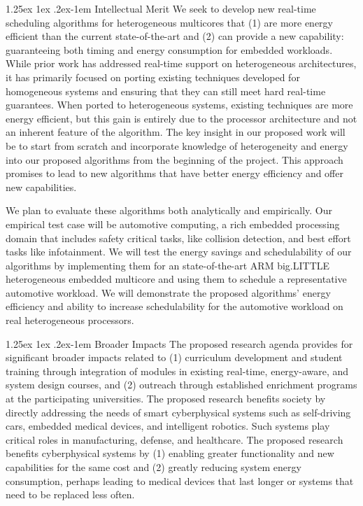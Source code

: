 \documentclass[10pt,letterpaper]{article}
\makeatletter
\renewcommand{\paragraph}{%
  \@startsection{paragraph}{4}%
  {\z@}{1.25ex \@plus 1ex \@minus .2ex}{-1em}%
  {\normalfont\normalsize\bfseries}%
}
\makeatother
\begin{document}
\paragraph{Intellectual Merit} 
We seek to develop new real-time scheduling algorithms for
heterogeneous multicores that (1) are more energy efficient than the
current state-of-the-art and (2) can provide a new capability:
guaranteeing both timing and energy consumption for embedded
workloads.  While prior work has addressed real-time support on
heterogeneous architectures, it has primarily focused on porting
existing techniques developed for homogeneous systems and ensuring
that they can still meet hard real-time guarantees.  When ported to
heterogeneous systems, existing techniques are more energy efficient,
but this gain is entirely due to the processor architecture and not an
inherent feature of the algorithm.  The key insight in our proposed
work will be to start from scratch and incorporate knowledge of
heterogeneity and energy into our proposed algorithms from the
beginning of the project.  This approach promises to lead to new
algorithms that have better energy efficiency and offer new
capabilities.

We plan to evaluate these algorithms both analytically and
empirically.  Our empirical test case will be automotive computing, a
rich embedded processing domain that includes safety critical tasks,
like collision detection, and best effort tasks like infotainment.  We
will test the energy savings and schedulability of our algorithms by
implementing them for an state-of-the-art ARM big.LITTLE heterogeneous
embedded multicore and using them to schedule a representative
automotive workload.  We will demonstrate the proposed algorithms'
energy efficiency and ability to increase schedulability for the
automotive workload on real heterogeneous processors.

\paragraph{Broader Impacts}
The proposed research agenda provides for significant broader impacts
related to (1) curriculum development and student training through
integration of modules in existing real-time, energy-aware, and system
design courses, and (2) outreach through established enrichment
programs at the participating universities. The proposed research
benefits society by directly addressing the needs of smart
cyberphysical systems such as self-driving cars, embedded medical
devices, and intelligent robotics.  Such systems play critical roles
in manufacturing, defense, and healthcare. The proposed research
benefits cyberphysical systems by (1) enabling greater functionality
and new capabilities for the same cost and (2) greatly reducing system
energy consumption, perhaps leading to medical devices that last
longer or systems that need to be replaced less often.
\end{document}
